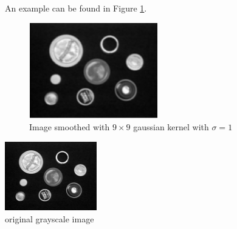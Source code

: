 \documentclass[12pt]{article}
\begin{document}
\noindent
An example can be found in Figure \ref{fig1}.

\begin{figure}[H]
\begin{center}
\includegraphics[width=0.5\textwidth]{part1.png}
\caption{Image smoothed with $9\times 9$ gaussian kernel with $\sigma=1$ }
\label{fig1}
\end{center}
\end{figure}

\begin{center}
\includegraphics[width=0.3\textwidth]{original_grayscale_image.jpg}
\\original grayscale image
\end{center}

\newpage
\end{document}

